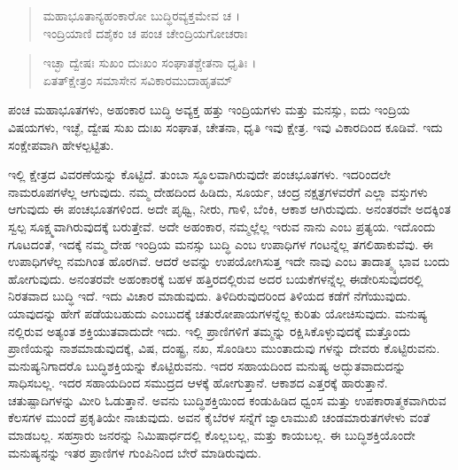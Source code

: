 \begin{verse}
ಮಹಾಭೂತಾನ್ಯಹಂಕಾರೋ ಬುದ್ಧಿರವ್ಯಕ್ತಮೇವ ಚ ।\\ಇಂದ್ರಿಯಾಣಿ ದಶೈಕಂ ಚ ಪಂಚ ಚೇಂದ್ರಿಯಗೋಚರಾಃ 
\end{verse}

\begin{verse}
ಇಚ್ಛಾ ದ್ವೇಷಃ ಸುಖಂ ದುಃಖಂ ಸಂಘಾತಶ್ಚೇತನಾ ಧೃತಿಃ ।\\ಏತತ್​ಕ್ಷೇತ್ರಂ ಸಮಾಸೇನ ಸವಿಕಾರಮುದಾಹೃತಮ್ 
\end{verse}

{\small ಪಂಚ ಮಹಾಭೂತಗಳು, ಅಹಂಕಾರ ಬುದ್ಧಿ ಅವ್ಯಕ್ತ ಹತ್ತು ಇಂದ್ರಿಯಗಳು ಮತ್ತು ಮನಸ್ಸು, ಐದು ಇಂದ್ರಿಯ ವಿಷಯಗಳು, ಇಚ್ಛೆ, ದ್ವೇಷ ಸುಖ ದುಃಖ ಸಂಘಾತ, ಚೇತನಾ, ಧೃತಿ ಇವು ಕ್ಷೇತ್ರ. ಇವು ವಿಕಾರದಿಂದ ಕೂಡಿವೆ. ಇದು ಸಂಕ್ಷೇಪವಾಗಿ ಹೇಳಲ್ಪಟ್ಟಿತು.}

ಇಲ್ಲಿ ಕ್ಷೇತ್ರದ ವಿವರಣೆಯನ್ನು ಕೊಟ್ಟಿದೆ. ತುಂಬಾ ಸ್ಥೂಲವಾಗಿರುವುದೇ ಪಂಚಭೂತಗಳು. ಇದರಿಂದಲೇ ನಾಮರೂಪಗಳೆಲ್ಲ ಆಗುವುದು. ನಮ್ಮ ದೇಹದಿಂದ ಹಿಡಿದು, ಸೂರ್ಯ, ಚಂದ್ರ ನಕ್ಷತ್ರಗಳವರೆಗೆ ಎಲ್ಲಾ ವಸ್ತುಗಳು ಆಗುವುದು ಈ ಪಂಚಭೂತಗಳಿಂದ. ಅದೇ ಪೃಥ್ವಿ, ನೀರು, ಗಾಳಿ, ಬೆಂಕಿ, ಆಕಾಶ ಆಗಿರುವುದು. ಅನಂತರವೇ ಅದಕ್ಕಿಂತ ಸ್ವಲ್ಪ ಸೂಕ್ಷ್ಮವಾಗಿರುವುದಕ್ಕೆ ಬರುತ್ತೇವೆ. ಅದೇ ಅಹಂಕಾರ, ನಮ್ಮಲ್ಲೆಲ್ಲ ಇರುವ ನಾನು ಎಂಬ ಪ್ರತ್ಯಯ. ಇದೊಂದು ಗೂಟದಂತೆ, ಇದಕ್ಕೆ ನಮ್ಮ ದೇಹ ಇಂದ್ರಿಯ ಮನಸ್ಸು ಬುದ್ಧಿ ಎಂಬ ಉಪಾಧಿಗಳ ಗಂಟನ್ನೆಲ್ಲ ತಗಲಿಹಾಕುವೆವು. ಈ ಉಪಾಧಿಗಳೆಲ್ಲ ನಮಗಿಂತ ಹೊರಗಿವೆ. ಆದರೆ ಅವನ್ನು ಉಪಯೋಗಿಸುತ್ತ ಇದೇ ನಾವು ಎಂಬ ತಾದಾತ್ಮ್ಯ ಭಾವ ಬಂದು ಹೋಗುವುದು. ಅನಂತರವೇ ಅಹಂಕಾರಕ್ಕೆ ಬಹಳ ಹತ್ತಿರದಲ್ಲಿರುವ ಅದರ ಬಯಕೆಗಳನ್ನೆಲ್ಲ ಈಡೇರಿಸುವುದರಲ್ಲಿ ನಿರತವಾದ ಬುದ್ಧಿ ಇದೆ. ಇದು ವಿಚಾರ ಮಾಡುವುದು. ತಿಳಿದಿರುವುದರಿಂದ ತಿಳಿಯದ ಕಡೆಗೆ ನೆಗೆಯುವುದು. ಯಾವುದನ್ನು ಹೇಗೆ ಪಡೆಯಬಹುದು ಎಂಬುದಕ್ಕೆ ಚತುರೋಪಾಯಗಳನ್ನೆಲ್ಲ ಕುರಿತು ಯೋಚಿಸುವುದು. ಮನುಷ್ಯ ನಲ್ಲಿರುವ ಅತ್ಯಂತ ಶಕ್ತಿಯುತವಾದುದೇ ಇದು. ಇಲ್ಲಿ ಪ್ರಾಣಿಗಳಿಗೆ ತಮ್ಮನ್ನು ರಕ್ಷಿಸಿಕೊಳ್ಳುವುದಕ್ಕೆ ಮತ್ತೊಂದು ಪ್ರಾಣಿಯನ್ನು ನಾಶಮಾಡುವುದಕ್ಕೆ, ವಿಷ, ದಂಷ್ಟ್ರ, ನಖ, ಸೊಂಡಿಲು ಮುಂತಾದುವು ಗಳನ್ನು ದೇವರು ಕೊಟ್ಟಿರುವನು. ಮನುಷ್ಯನಿಗಾದರೊ ಬುದ್ಧಿಶಕ್ತಿಯನ್ನು ಕೊಟ್ಟಿರುವನು. ಇದರ ಸಹಾಯದಿಂದ ಮನುಷ್ಯ ಅದ್ಭುತವಾದುದನ್ನು ಸಾಧಿಸಬಲ್ಲ. ಇದರ ಸಹಾಯದಿಂದ ಸಮುದ್ರದ ಆಳಕ್ಕೆ ಹೋಗುತ್ತಾನೆ. ಆಕಾಶದ ಎತ್ತರಕ್ಕೆ ಹಾರುತ್ತಾನೆ. ಚತುಷ್ಪಾದಿಗಳನ್ನು ಮೀರಿ ಓಡುತ್ತಾನೆ. ಅವನು ಬುದ್ಧಿಶಕ್ತಿಯಿಂದ ಕಂಡುಹಿಡಿದ ಧ್ವಂಸ ಮತ್ತು ಉಪಕಾರಾತ್ಮಕವಾಗಿರುವ ಕೆಲಸಗಳ ಮುಂದೆ ಪ್ರಕೃತಿಯೇ ನಾಚುವುದು. ಅವನ ಕೈಬೆರಳ ಸನ್ನೆಗೆ ಜ್ವಾಲಾಮುಖಿ ಚಂಡಮಾರುತಗಳೇಳು ವಂತೆ ಮಾಡಬಲ್ಲ. ಸಹಸ್ರಾರು ಜನರನ್ನು ನಿಮಿಷಾರ್ಧದಲ್ಲಿ ಕೊಲ್ಲಬಲ್ಲ, ಮತ್ತು ಕಾಯಬಲ್ಲ. ಈ ಬುದ್ಧಿಶಕ್ತಿಯೊಂದೇ ಮನುಷ್ಯನನ್ನು ಇತರ ಪ್ರಾಣಿಗಳ ಗುಂಪಿನಿಂದ ಬೇರೆ ಮಾಡಿರುವುದು.\eng{}

